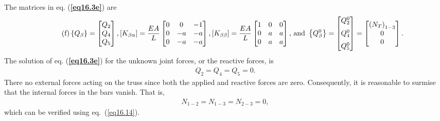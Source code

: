 \documentclass{AeroStructure-ERJohnson}
\begin{document}
\begin{example}
\noindent The matrices in eq. (\textbf{\ref{eq16.3e}}) are
\begin{align}\label{eq16.3f}\tag{f}
\left\{Q_{\beta}\right\}=\left[\begin{array}{@{}c@{}}Q_{2} \\Q_{4} \\Q_{5}\end{array}\right], \left[K_{\beta \alpha}\right]=\frac{E A}{L}\left[\begin{array}{@{}ccc@{}}0 & 0 & -1 \\0 & -a & -a \\0 & -a & -a\end{array}\right], \left[K_{\beta \beta}\right]=\frac{E A}{L}\left[\begin{array}{@{}lll@{}}1 & 0 & 0 \\0 & a & a \\0 & a & a\end{array}\right]\mbox{, and }\left\{Q_{\beta}^{0}\right\}=\left[\begin{array}{@{}l@{}}Q_{2}^{0} \\[6pt] Q_{4}^{0} \\[6pt] Q_{5}^{0}\end{array}\right]=\left[\begin{array}{@{}c@{}}\left(N_{T}\right)_{1-3} \\0 \\0\end{array}\right].
\end{align}
The solution of eq. (\textbf{\ref{eq16.3e}}) for the unknown joint forces, or the reactive forces, is
\begin{align}\label{eq16.3g}\tag{g}
Q_{2}=Q_{4}=Q_{5}=0.
\end{align}
There no external forces acting on the truss since both the applied and reactive forces are zero. Consequently, it is reasonable to surmise that the internal forces in the bars vanish. That is,
\begin{align}\label{eq16.3h}\tag{h}
N_{1-2}=N_{1-3}=N_{2-3}=0,
\end{align}
which can be verified using eq.~(\ref{eq16.14}).


\end{example}
\end{document}
